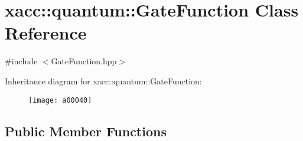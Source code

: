 \hypertarget{a00040}{}\section{xacc\+:\+:quantum\+:\+:Gate\+Function Class Reference}
\label{a00040}


{\ttfamily \#include $<$Gate\+Function.\+hpp$>$}

Inheritance diagram for xacc\+:\+:quantum\+:\+:Gate\+Function\+:\begin{figure}[H]
\begin{center}
\leavevmode
\texttt{[image: a00040]}
\end{center}
\end{figure}
\subsection*{Public Member Functions}
